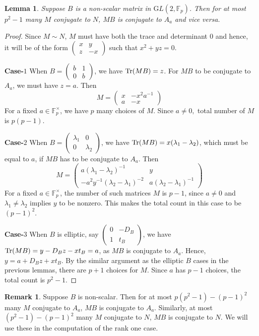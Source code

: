 \documentclass[12pt,reqno]{amsart}
\theoremstyle{plain}
\newtheorem{lemma}[thm]{Lemma}
\theoremstyle{definition}
\newtheorem{rmks}[thm]{Remark}
\newcommand{\Tr}{{\rm Tr}}
\newcommand{\GL}{{\mathrm GL}}
\theoremstyle{remark}
\newcommand{\FF}{\mathbb{F}}
\begin{document}
\begin{lemma}\label{lem: A_a goes to N and vice versa}
    Suppose $B$ is a non-scalar matrix in $\GL(2, \FF_p)$. Then for at most $p^2-1$ many $M$ conjugate to $N$, $MB$ is conjugate to $A_a$ and vice versa.
\end{lemma}
\begin{proof}
    Since $M \sim N$, $M$ must have both the trace and determinant $0$ and hence, it will be of the form $\begin{pmatrix}
        x & y \\ z & -x
    \end{pmatrix}$ such that $x^2 +yz=0.$
    
    \textbf{Case-$1$} When $B= \begin{pmatrix}
        b & 1\\
        0 & b
    \end{pmatrix}$, we have $\Tr(MB)=z$. For $MB$ to be conjugate to $A_a$, we must have $z=a.$ Then $$M =\begin{pmatrix}
        x & -x^2a^{-1}\\ a & -x
    \end{pmatrix}$$ For a fixed $a\in\FF_p^{\times}$, we have $p$ many choices of $M$. Since $a\neq 0,$ total number of $M$ is $p(p-1).$
    
    \textbf{Case-$2$} When $B= \begin{pmatrix}
        \lambda_1 & 0\\
        0 & \lambda_2
    \end{pmatrix}$, we have $\Tr(MB)=x(\lambda_1 - \lambda_2)$, which must be equal to $a$, if $MB$ has to be conjugate to $A_a.$ Then 
    $$M = \begin{pmatrix}
        a(\lambda_1- \lambda_2)^{-1} & y\\ -a^2y^{-1}(\lambda_2- \lambda_1)^{-2} & a(\lambda_2- \lambda_1)^{-1}
    \end{pmatrix}$$
    For a fixed $a\in\FF_p^{\times}$, the number of such matrices $M$ is $p-1$, since $a \neq 0$ and $\lambda_1 \neq \lambda_2$ implies $y$ to be nonzero. This makes the total count in this case to be $(p-1)^2.$
    
    \textbf{Case-$3$} When $B$ is elliptic, say $\begin{pmatrix}
        0 & -D_B\\ 1 &t_B
    \end{pmatrix}$, we have $\Tr(MB)=y-D_Bz-xt_B=a$, as $MB$ is conjugate to $A_a.$ Hence, $y=a+D_Bz+xt_B$. By the similar argument as the elliptic $B$ cases in the previous lemmas, there are $p+1$ choices for $M.$ Since $a$ has $p-1$ choices, the total count is $p^2-1.$
\end{proof}
\begin{rmks}\label{A_a goes to A_a and N goes to N}
    Suppose $B$ is non-scalar. Then for at most $p(p^2-1)-(p-1)^2$ many $M$ conjugate to $A_a$, $MB$ is conjugate to $A_a$. Similarly,  at most $(p^2-1)-(p-1)^2$ many $M$ conjugate to $N$, $MB$ is conjugate to $N$. We will use these in the computation of the rank one case.
\end{rmks}
\end{document}
